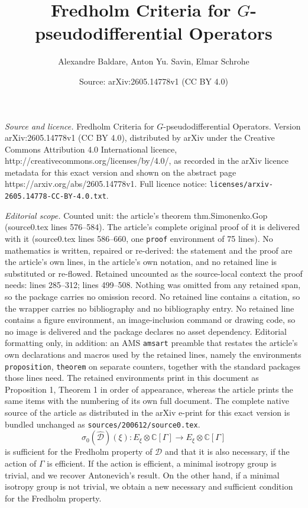 \documentclass[10pt,a4paper]{amsart}
\title{Fredholm Criteria for $G$-pseudodifferential Operators}
\author{Alexandre Baldare, Anton Yu. Savin, Elmar Schrohe}
\date{Source: arXiv:2605.14778v1 (CC BY 4.0)}
\newcommand{\C}{\mathbb C}
\newcommand{\maD}{\mathcal D}
\begin{document}
\maketitle

\noindent\emph{Source and licence.} Fredholm Criteria for $G$-pseudodifferential Operators. Version arXiv:2605.14778v1 (CC BY 4.0), distributed by arXiv under the Creative Commons Attribution 4.0 International licence, http://creativecommons.org/licenses/by/4.0/, as recorded in the arXiv licence metadata for this exact version and shown on the abstract page https://arxiv.org/abs/2605.14778v1. Full licence notice: \texttt{licenses/arxiv-2605.14778-CC-BY-4.0.txt}.\par\smallskip

\noindent\textit{Editorial scope.} Counted unit: the article's theorem thm.Simonenko.Gop (source0.tex lines 576--584). The article's complete original proof of it is delivered with it (source0.tex lines 586--660, one \texttt{proof} environment of 75 lines). No mathematics is written, repaired or re-derived: the statement and the proof are the article's own lines, in the article's own notation, and no retained line is substituted or re-flowed.  Retained uncounted as the source-local context the proof needs: lines 285--312; lines 499--508.  Nothing was omitted from any retained span, so the package carries no omission record.  No retained line contains a citation, so the wrapper carries no bibliography and no bibliography entry.  No retained line contains a figure environment, an image-inclusion command or drawing code, so no image is delivered and the package declares no asset dependency.  Editorial formatting only, in addition: an AMS \texttt{amsart} preamble that restates the article's own declarations and macros used by the retained lines, namely the environments \texttt{proposition}, \texttt{theorem} on separate counters, together with the standard packages those lines need.  The retained environments print in this document as Proposition 1, Theorem 1 in order of appearance, whereas the article prints the same items with the numbering of its own full document.  The complete native source of the article as distributed in the arXiv e-print for this exact version is bundled unchanged as \texttt{sources/200612/source0.tex}.
\begin{equation*}
\sigma_0(\hat{\maD})(\xi) : E_\xi \otimes \C[\Gamma] \rightarrow E_\xi \otimes \C[\Gamma]  
\end{equation*}
is sufficient for the Fredholm property of $\maD$ and that it is also necessary,  if the action of $\Gamma$ is efficient. If the action is efficient, a minimal isotropy group is trivial, and we recover Antonevich's result. On the other hand, if a minimal isotropy group is not trivial, we  obtain a new necessary and sufficient condition for the Fredholm property.
\end{document}
